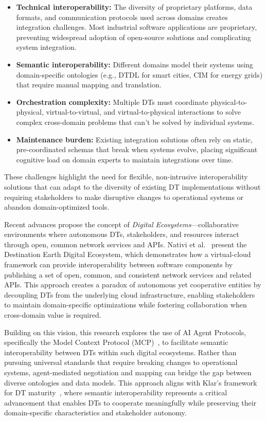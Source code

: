 \begin{itemize}
    \item \textbf{Technical interoperability:} The diversity of proprietary platforms, data formats, and communication protocols used across domains creates integration challenges. Most industrial software applications are proprietary, preventing widespread adoption of open-source solutions and complicating system integration.
    
    \item \textbf{Semantic interoperability:} Different domains model their systems using domain-specific ontologies (e.g., DTDL for smart cities, CIM for energy grids) that require manual mapping and translation.

    \item \textbf{Orchestration complexity:} Multiple DTs must coordinate physical-to-physical, virtual-to-virtual, and virtual-to-physical interactions to solve complex cross-domain problems that can't be solved by individual systems.

    \item \textbf{Maintenance burden:} Existing integration solutions often rely on static, pre-coordinated schemas that break when systems evolve, placing significant cognitive load on domain experts to maintain integrations over time.
\end{itemize}

These challenges highlight the need for flexible, non-intrusive interoperability solutions that can adapt to the diversity of existing DT implementations without requiring stakeholders to make disruptive changes to operational systems or abandon domain-optimized tools.

Recent advances propose the concept of \emph{Digital Ecosystems}---collaborative environments where autonomous DTs, stakeholders, and resources interact through open, common network services and APIs.
Nativi et al.~\cite{Nativi_2021} present the Destination Earth Digital Ecosystem, 
    which demonstrates how a virtual-cloud framework can provide interoperability between software components 
    by publishing a set of open, common, and consistent network services and related APIs.
This approach creates a paradox of autonomous yet cooperative entities by decoupling DTs from the underlying cloud infrastructure, 
    enabling stakeholders to maintain domain-specific optimizations while fostering collaboration when cross-domain value is required.

Building on this vision, this research explores the use of AI Agent Protocols, specifically the Model Context Protocol (MCP)~\cite{Hou_2025}, 
    to facilitate semantic interoperability between DTs within such digital ecosystems.
Rather than pursuing universal standards that require breaking changes to operational systems, agent-mediated negotiation and mapping can bridge the gap between diverse ontologies and data models.
This approach aligns with Klar's framework for DT maturity~\cite{Klar_2024},
    where semantic interoperability represents a critical advancement that enables DTs to cooperate meaningfully while preserving their domain-specific characteristics and stakeholder autonomy.

